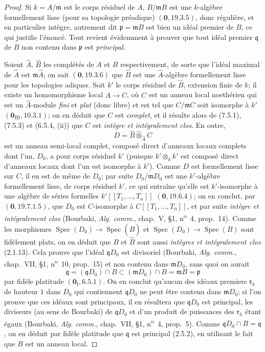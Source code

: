 \begin{proof}
Si $k=A/\mathfrak m$ est le corps résiduel de $A$, $B/\mathfrak mB$ est une
$k$-algèbre formellement lisse (pour sa topologie préadique) $(\mathbf 0, 19.3.5)$,
donc régulière, et en particulier intègre, autrement dit
$\mathfrak p=\mathfrak mB$ est bien un idéal premier de $B$, ce qui justifie
l'énoncé. Tout revient évidemment à prouver que tout idéal premier $\mathfrak q$ de
$B$ non contenu dans $\mathfrak p$ est \emph{principal}.

Soient $\widehat A$, $\widehat B$ les complétés de $A$ et $B$ respectivement, de
sorte que l'idéal maximal de $\widehat A$ est $\mathfrak m\widehat A$; on sait
$(\mathbf 0, 19.3.6)$ que $\widehat B$ est une $\widehat A$-algèbre formellement
lisse pour les topologies adiques. Soit $k'$ le corps résiduel de $\widehat B$,
extension finie de $k$; il existe un homomorphisme local $\widehat A\to C$, où $C$
est un anneau local noethérien qui est un $\widehat A$-module \emph{fini} et
\emph{plat} (donc libre) et est tel que $C/\mathfrak mC$ soit isomorphe à $k'$
$(\mathbf 0_{\mathrm{III}}, 10.3.1)$; on en déduit que $C$ est \emph{complet}, et il
résulte alors de (7.5.1), (7.5.3) et (6.5.4, (ii)) que $C$ est \emph{intègre et
intégralement clos}. En outre,
\[
  D=\widehat B\widehat\otimes_{\widehat A}C
\]
est un anneau semi-local complet, composé direct d'anneaux locaux complets dont l'un,
$D_0$, a pour corps résiduel $k'$ (puisque $k'\otimes_k k'$ est composé direct
d'anneaux locaux dont l'un est isomorphe à $k'$). Comme $D$ est formellement lisse
sur $C$, il en est de même de $D_0$; par suite $D_0/\mathfrak mD_0$ est une
$k'$-algèbre formellement lisse, de corps résiduel $k'$, ce qui entraîne qu'elle est
$k'$-isomorphe à une algèbre de séries formelles
$k'[[T_1,\ldots,T_n]]$ $(\mathbf 0, 19.6.4)$; on en conclut, par
$(\mathbf 0, 19.7.1.5)$, que $D_0$ est $C$-isomorphe à
$C[[T_1,\ldots,T_n]]$, et par suite \emph{intègre et intégralement clos} (Bourbaki,
\emph{Alg. comm.}, chap.~V, \S1, n\textsuperscript{o}~4, prop.~14). Comme les
morphismes $\operatorname{Spec}(D_0)\to\operatorname{Spec}(\widehat B)$ et
$\operatorname{Spec}(D_0)\to\operatorname{Spec}(B)$ sont fidèlement plats, on en
déduit que $B$ et $\widehat B$ sont aussi \emph{intègres et intégralement clos}
(2.1.13). Cela prouve que l'idéal $\mathfrak qD_0$ est divisoriel (Bourbaki,
\emph{Alg. comm.}, chap.~VII, \S1, n\textsuperscript{o}~10, prop.~15) et non contenu
dans $\mathfrak mD_0$, sans quoi on aurait
\[
  \mathfrak q=(\mathfrak qD_0)\cap B
  \subset(\mathfrak mD_0)\cap B=\mathfrak mB=\mathfrak p
\]
par fidèle platitude $(\mathbf 0_{\mathrm I}, 6.5.1)$. On en conclut qu'aucun des
idéaux premiers $\mathfrak r_h$ de hauteur $1$ dans $D_0$ qui contiennent
$\mathfrak qD_0$ ne peut être contenu dans $\mathfrak mD_0$; si l'on prouve que ces
idéaux sont principaux, il en résultera que $\mathfrak qD_0$ est principal, les
diviseurs (au sens de Bourbaki) de $\mathfrak qD_0$ et d'un produit de puissances des
$\mathfrak r_h$ étant égaux (Bourbaki, \emph{Alg. comm.}, chap.~VII, \S1,
n\textsuperscript{o}~4, prop.~5). Comme $\mathfrak qD_0\cap B=\mathfrak q$, on en
déduit par fidèle platitude que $\mathfrak q$ est principal (2.5.2), en utilisant le
fait que $B$ est un anneau local.


\end{proof}
